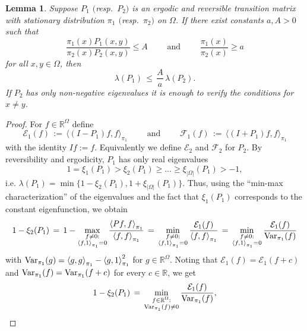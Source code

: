 \documentclass{dis}
\newtheorem{lemma}[theorem]{Lemma}
\theoremstyle{citing}
\begin{document}
\vspace{1mm}
\begin{lemma}\label{lemma:prelim_comparison}
Suppose $P_1$ $($resp.~$P_2$$)$ is an ergodic and 
reversible transition matrix 
with stationary distribution $\pi_1$ $($resp.~$\pi_2$$)$ on ${\Omega}$. 
If there exist constants $a,A>0$ such that
\[
\frac{\pi_1(x) P_1(x,y)}{\pi_2(x) P_2(x,y)} \le A 
\qquad\text{ and }\qquad
\frac{\pi_1(x)}{\pi_2(x)} \ge a
\]
for all $x,y\in{\Omega}$, then
\[
\lambda(P_1) \,\le\, \frac{A}{a}\, \lambda(P_2).
\]
If $P_2$ has only non-negative eigenvalues 
it is enough to verify the conditions for $x\neq y$.
\end{lemma}
\vspace{1mm}

\begin{proof}
For $f\in{\ensuremath{\mathbb{R}}}^{\Omega}$ define
\[
{\mathcal{E}}_1(f) \,:=\, {\langle} (I-P_1)f, f{\rangle}_{\pi_1} \qquad\text{ and }\qquad
{\mathcal{F}}_1(f) \,:=\, {\langle} (I+P_1)f, f{\rangle}_{\pi_1}
\]
with the identity $If:=f$. 
Equivalently we define ${\mathcal{E}}_2$ and ${\mathcal{F}}_2$ for $P_2$.
By reversibility and ergodicity, $P_1$ has only real eigenvalues 
\[
1=\xi_1(P_1)>\xi_2(P_1)\ge\dots\ge\xi_{{\left\vert {\Omega} \right\vert}}(P_1)>-1, 
\] 
i.e. $\lambda(P_1)=\min\{1-\xi_2(P_1), 1+\xi_{{\left\vert {\Omega} \right\vert}}(P_1)\}$.
Thus, 
using the ``min-max characterization'' of the eigenvalues 
\cite[Thms. 4.2.2 \& 4.2.11]{HJ-matrix} 
and the fact that $\xi_1(P_1)$ corresponds to the constant eigenfunction, 
we obtain
\[
1-\xi_2(P_1) \,=\, 1-\max_{\substack{f\neq0:\\ {\langle} f,1{\rangle}_{\pi_1}=0}}
	\frac{{\langle} Pf, f{\rangle}_{\pi_1}}{{\langle} f, f{\rangle}_{\pi_1}} 
\,=\, \min_{\substack{f\neq0:\\ {\langle} f,1{\rangle}_{\pi_1}=0}}
	\frac{{\mathcal{E}}_1(f)}{{\langle} f, f{\rangle}_{\pi_1}} 
\,=\, \min_{\substack{f\neq0:\\ {\langle} f,1{\rangle}_{\pi_1}=0}} 
	\frac{{\mathcal{E}}_1(f)}{{{\rm Var}}_{\pi_1}(f)}
\]
with ${{\rm Var}}_{\pi_1}(g)={\langle} g,g{\rangle}_{\pi_1}-{\langle} g,1{\rangle}_{\pi_1}^2$ 
for $g\in{\ensuremath{\mathbb{R}}}^{\Omega}$. 
Noting that ${\mathcal{E}}_1(f)={\mathcal{E}}_1(f+c)$ and 
${{\rm Var}}_{\pi_1}(f)={{\rm Var}}_{\pi_1}(f+c)$ for every $c\in{\ensuremath{\mathbb{R}}}$, 
we get
\[
1-\xi_2(P_1)
\,=\, \min_{\substack{f\in{\ensuremath{\mathbb{R}}}^{\Omega}:\\ {{\rm Var}}_{\pi_1}(f)\neq0}} 
	\frac{{\mathcal{E}}_1(f)}{{{\rm Var}}_{\pi_1}(f)}, 
\]
\end{proof}
\end{document}
